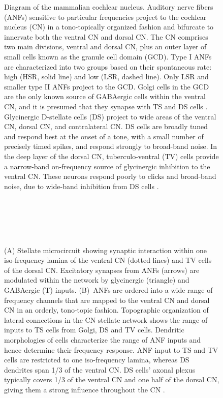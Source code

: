 \begin{figure}[pt!]
\centering
   \caption{Diagram of the mammalian cochlear nucleus. Auditory nerve
     fibers (ANFs) sensitive to particular frequencies project to the
     cochlear nucleus (CN) in a tono-topically organized fashion and
     bifurcate to innervate both the ventral CN and dorsal CN\@. The
     CN comprises two main divisions, ventral and dorsal CN, plus an
     outer layer of small cells known as the granule cell domain
     (GCD). Type I ANFs are characterized into two groups based on
     their spontaneous rate: high (HSR, solid line) and low (LSR,
     dashed line). Only LSR and smaller type II ANFs project to the
     GCD\@.  Golgi cells in the GCD are the only known source of
     GABAergic cells within the ventral CN, and it is presumed that
     they synapse with TS and DS cells
     \cite{FerragamoGoldingEtAl:1998}. Glycinergic D-stellate cells
     (DS) project to wide areas of the ventral CN, dorsal CN, and
     contralateral CN\@. DS cells are broadly tuned and respond best
     at the onset of a tone, with a small number of precisely timed
     spikes, and respond strongly to broad-band noise.  In the deep
     layer of the dorsal CN, tuberculo-ventral (TV) cells provide a
     narrow-band on-frequency source of glycinergic inhibition to the
     ventral CN\@. These neurons respond poorly to clicks and
     broad-band noise, due to wide-band inhibition from DS cells
     \cite{SpirouDavisEtAl:1999}.}%
\label{fig:GA:CNdiagram}
 \end{figure}
 \clearpage


\begin{figure}[t!]
\centering
{}\hspace{3in}\\
\\
\hspace{3in}\\
\\
\caption{(A) Stellate microcircuit showing synaptic interaction within
  one iso-frequency lamina of the ventral CN (dotted lines) and TV
  cells of the dorsal CN\@. Excitatory synapses from ANFs (arrows) are
  modulated within the network by glycinergic (triangle) and GABAergic
  (T) inputs. (B)~ANFs are ordered into a wide range of frequency
  channels that are mapped to the ventral CN and dorsal CN in an
  orderly, tono-topic fashion. Topographic organization of lateral
  connections in the CN stellate network shows the range of inputs to
  TS cells from Golgi, DS and TV cells. Dendritic morphologies of
  cells characterize the range of ANF inputs and hence determine their
  frequency response. ANF input to TS and TV cells are restricted to
  one iso-frequency lamina, whereas DS dendrites span 1/3 of the
  ventral CN\@. DS cells' axonal plexus typically covers 1/3 of the
  ventral CN and one half of the dorsal CN, giving them a strong
  influence throughout the CN \cite{ArnottWallaceEtAl:2004}.}
\label{fig:GA:MicroCN}
\end{figure}

